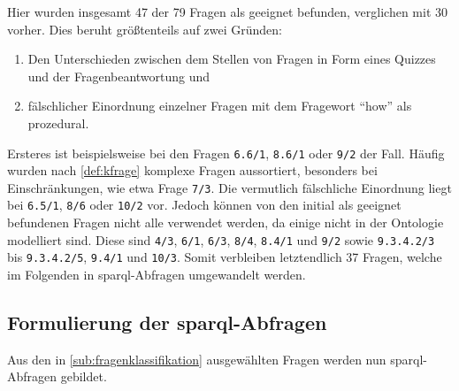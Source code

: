 Hier wurden insgesamt 47 der 79 Fragen als geeignet befunden, verglichen mit 30 vorher.
Dies beruht größtenteils auf zwei Gründen:
\begin{enumerate}
  \item Den Unterschieden zwischen dem Stellen von Fragen in Form eines Quizzes und der Fragenbeantwortung und
  \item fälschlicher Einordnung einzelner Fragen mit dem Fragewort \enquote{how} als prozedural.
\end{enumerate}
Ersteres ist beispielsweise bei den Fragen \texttt{6.6/1}, \texttt{8.6/1} oder \texttt{9/2} der Fall.
Häufig wurden nach \cref{def:kfrage} komplexe Fragen aussortiert, besonders bei Einschränkungen, wie etwa Frage \texttt{7/3}.
Die vermutlich fälschliche Einordnung liegt bei \texttt{6.5/1}, \texttt{8/6} oder \texttt{10/2} vor.
Jedoch können von den initial als geeignet befundenen Fragen nicht alle verwendet werden, da einige nicht in der Ontologie modelliert sind.
Diese sind \texttt{4/3}, \texttt{6/1}, \texttt{6/3}, \texttt{8/4}, \texttt{8.4/1} und \texttt{9/2} sowie \texttt{9.3.4.2/3} bis \texttt{9.3.4.2/5}, \texttt{9.4/1} und \texttt{10/3}.
Somit verbleiben letztendlich 37 Fragen, welche im Folgenden in \ac{sparql}-Abfragen umgewandelt werden.

\subsection[Formulierung der SPARQL-Abfragen]{Formulierung der \ac{sparql}-Abfragen}

Aus den in \cref{sub:fragenklassifikation} ausgewählten Fragen werden nun \ac{sparql}-Abfragen gebildet.

